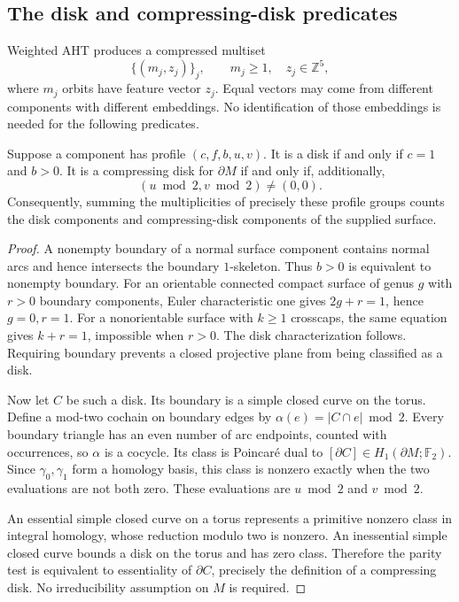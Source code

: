 \subsection{The disk and compressing-disk predicates}
\label{nc:disk-predicate}

Weighted AHT produces a compressed multiset
\[
 \{(m_j,z_j)\}_j,
 \qquad m_j\geq1,\quad z_j\in\mathbb Z^5,
\]
where $m_j$ orbits have feature vector $z_j$.  Equal vectors may
come from different components with different embeddings.  No
identification of those embeddings is needed for the following
predicates.

\begin{theorem}\label{nc:disk-criterion}
Suppose a component has profile $(c,f,b,u,v)$.  It is a disk if
and only if $c=1$ and $b>0$.  It is a compressing disk for
$\partial M$ if and only if, additionally,
\[
 (u\bmod2,v\bmod2)\ne(0,0).
\]
Consequently, summing the multiplicities of precisely these
profile groups counts the disk components and compressing-disk
components of the supplied surface.
\end{theorem}
\begin{proof}
A nonempty boundary of a normal surface component contains
normal arcs and hence intersects the boundary $1$-skeleton.
Thus $b>0$ is equivalent to nonempty boundary.  For an orientable
connected compact surface of genus $g$ with $r>0$ boundary
components, Euler characteristic one gives $2g+r=1$, hence
$g=0,r=1$.  For a nonorientable surface with $k\geq1$ crosscaps,
the same equation gives $k+r=1$, impossible when $r>0$.
The disk characterization follows.  Requiring boundary prevents
a closed projective plane from being classified as a disk.

Now let $C$ be such a disk.  Its boundary is a simple closed
curve on the torus.  Define a mod-two cochain on boundary edges by
$\alpha(e)=|C\cap e|\bmod2$.  Every boundary triangle has an even
number of arc endpoints, counted with occurrences, so $\alpha$
is a cocycle.  Its class is Poincar\'e dual to
$[\partial C]\in H_1(\partial M;\mathbb F_2)$.
Since $\gamma_0,\gamma_1$ form a homology basis, this class is
nonzero exactly when the two evaluations are not both zero.
These evaluations are $u\bmod2$ and $v\bmod2$.

An essential simple closed curve on a torus represents a
primitive nonzero class in integral homology, whose reduction
modulo two is nonzero.  An inessential simple closed curve bounds
a disk on the torus and has zero class.  Therefore the parity
test is equivalent to essentiality of $\partial C$, precisely
the definition of a compressing disk.  No irreducibility
assumption on $M$ is required.
\end{proof}

